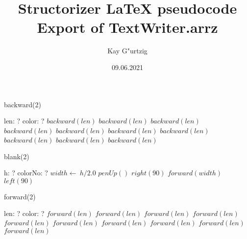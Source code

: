 \documentclass[a4paper,10pt]{article}
\title{Structorizer LaTeX pseudocode Export of TextWriter.arrz}
\author{Kay G"urtzig}
\date{09.06.2021}
\begin{document}
\begin{algorithm}
\caption{backward(2)}
\begin{algorithmic}[5]
    \State len: ?
    \State color: ?
  \EndDecl
      \State \(backward(len)\)
    \EndSelector
      \State \(backward(len)\)
    \EndSelector
      \State \(backward(len)\)
    \EndSelector
      \State \(backward(len)\)
    \EndSelector
      \State \(backward(len)\)
    \EndSelector
      \State \(backward(len)\)
    \EndSelector
      \State \(backward(len)\)
    \EndSelector
      \State \(backward(len)\)
    \EndSelector
      \State \(backward(len)\)
    \EndSelector
      \State \(backward(len)\)
    \EndSelector
  \EndCase
\EndProcedure
\end{algorithmic}
\end{algorithm}


\begin{algorithm}
\caption{blank(2)}
\begin{algorithmic}[5]
\State {}
    \State h: ?
    \State colorNo: ?
  \EndDecl
  \State \(width\gets\ h/2.0\)
  \State \(penUp()\)
  \State \(right(90)\)
  \State \(forward(width)\)
  \State \(left(90)\)
\EndProcedure
\end{algorithmic}
\end{algorithm}


\begin{algorithm}
\caption{forward(2)}
\begin{algorithmic}[5]
    \State len: ?
    \State color: ?
  \EndDecl
      \State \(forward(len)\)
    \EndSelector
      \State \(forward(len)\)
    \EndSelector
      \State \(forward(len)\)
    \EndSelector
      \State \(forward(len)\)
    \EndSelector
      \State \(forward(len)\)
    \EndSelector
      \State \(forward(len)\)
    \EndSelector
      \State \(forward(len)\)
    \EndSelector
      \State \(forward(len)\)
    \EndSelector
      \State \(forward(len)\)
    \EndSelector
      \State \(forward(len)\)
    \EndSelector
  \EndCase
\EndProcedure
\end{algorithmic}
\end{algorithm}
\end{document}
